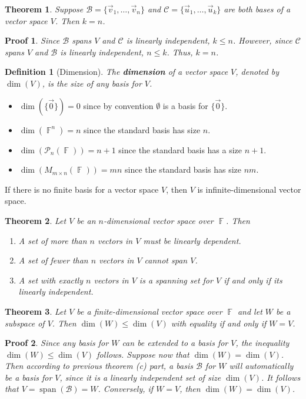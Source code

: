 \documentclass[10pt]{article}
\DeclareMathOperator{\F}{{\mathbb{F}}}
\DeclareMathOperator{\spn}{span}
\theoremstyle{break}
\newtheorem{thm}{Theorem}[subsection]
\newtheorem*{pf}{Proof}
\newtheorem{defn}{Definition}[subsection]
\begin{document}
\begin{thm}
    Suppose $\mathcal{B} = \{\vec{v}_1, \dots, \vec{v}_n\}$ and $\mathcal{C} = \{\vec{u}_1, \dots, \vec{u}_k\}$ are both bases of a vector space $V$. Then $k=n$.
\end{thm}
\begin{pf}
    Since $\mathcal{B}$ spans $V$ and $\mathcal{C}$ is linearly independent, $k \le n$. However, since $\mathcal{C}$ spans $V$ and $\mathcal{B}$ is linearly independent, $n \le k$. Thus, $k=n$.
\end{pf}
\begin{defn}[Dimension]
    The \textbf{dimension} of a vector space $V$, denoted by $\dim(V)$, is the size of any basis for $V$.
\end{defn}
\begin{itemize}
    \item $\dim(\{\vec{0}\}) = 0$ since by convention $\emptyset$ is a basis for $\{\vec{0}\}$.
    \item $\dim(\F^n) = n$ since the standard basis has size $n$.
    \item $\dim(\mathcal{P}_n(\F)) = n + 1$ since the standard basis has a size $n+1$.
    \item $\dim(M_{m \times n}(\F)) = mn$ since the standard basis has size $nm$.
\end{itemize}
If there is no finite basis for a vector space $V$, then $V$ is infinite-dimensional vector space.
\begin{thm}
    Let $V$ be an $n$-dimensional vector space over $\F$. Then 
    \begin{enumerate}
        \item[a.] A set of more than $n$ vectors in $V$ must be linearly dependent.
        \item[b.] A set of fewer than $n$ vectors in $V$ cannot span $V$.
        \item[c.] A set with exactly $n$ vectors in $V$ is a spanning set for $V$ if and only if its linearly independent. 
    \end{enumerate}
\end{thm}
\begin{thm}
    Let $V$ be a finite-dimensional vector space over $\F$ and let $W$ be a subspace of $V$. Then $\dim(W) \le \dim(V)$ with equality if and only if $W = V$.
\end{thm}
\begin{pf}
    Since any basis for $W$ can be extended to a basis for $V$, the inequality $\dim(W) \le \dim(V)$ follows. Suppose now that $\dim(W) = \dim(V)$. Then according to
    previous theorem (c) part, a basis $\mathcal{B}$ for $W$ will automatically be a basis for $V$, since it is a linearly independent set of size $\dim(V)$. It follows that $V = \spn(\mathcal{B}) = W$. Conversely, if $W = V$, then $\dim(W) = \dim(V)$. 
\end{pf}
\end{document}
